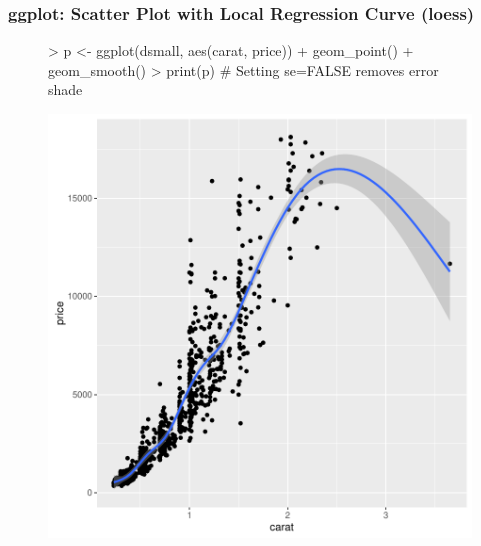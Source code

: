 \documentclass{beamer}
\begin{document}
\begin{frame}[containsverbatim]  
	\frametitle{ggplot: Scatter Plot with Local Regression Curve (loess)}
\scriptsize 
\begin{figure}
  \centering
\begin{Schunk}
\begin{Sinput}
> p <- ggplot(dsmall, aes(carat, price)) + geom_point() + geom_smooth() 
> print(p) # Setting se=FALSE removes error shade
\end{Sinput}
\end{Schunk}
\includegraphics{fig--047}
\label{fig:qplotscatter}
\end{figure}
\end{frame}
\end{document}
